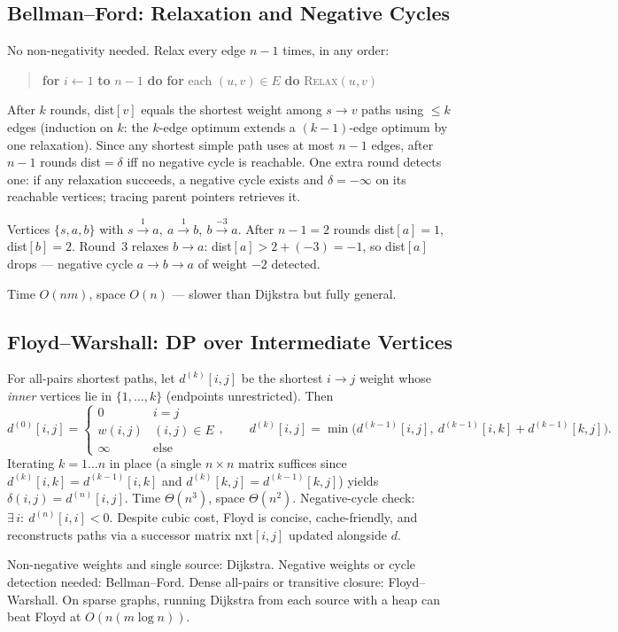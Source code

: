 \subsection{Bellman--Ford: Relaxation and Negative Cycles}
No non-negativity needed. Relax every edge $n-1$ times, in any order:

\begin{quote}\ttfamily\small
\textbf{for} $i\gets1$ \textbf{to} $n-1$ \textbf{do} \textbf{for} each $(u,v)\in E$ \textbf{do} \textsc{Relax}$(u,v)$
\end{quote}

After $k$ rounds, dist$[v]$ equals the shortest weight among $s\to v$ paths using $\le k$ edges (induction on $k$: the $k$-edge optimum extends a $(k-1)$-edge optimum by one relaxation). Since any shortest simple path uses at most $n-1$ edges, after $n-1$ rounds dist$=\delta$ iff no negative cycle is reachable. One extra round detects one: if any relaxation succeeds, a negative cycle exists and $\delta=-\infty$ on its reachable vertices; tracing parent pointers retrieves it.

\begin{example}
Vertices $\{s,a,b\}$ with $s\xrightarrow{1}a,\ a\xrightarrow{1}b,\ b\xrightarrow{-3}a$. After $n-1=2$ rounds dist$[a]=1$, dist$[b]=2$. Round~3 relaxes $b\to a$: dist$[a]>2+(-3)=-1$, so dist$[a]$ drops --- negative cycle $a\to b\to a$ of weight $-2$ detected.
\end{example}

Time $O(nm)$, space $O(n)$ --- slower than Dijkstra but fully general.

\subsection{Floyd--Warshall: DP over Intermediate Vertices}
For all-pairs shortest paths, let $d^{(k)}[i,j]$ be the shortest $i\to j$ weight whose \emph{inner} vertices lie in $\{1,\dots,k\}$ (endpoints unrestricted). Then
\[
d^{(0)}[i,j]=\begin{cases}0&i=j\\w(i,j)&(i,j)\in E\\\infty&\text{else}\end{cases},\qquad
d^{(k)}[i,j]=\min\bigl(d^{(k-1)}[i,j],\ d^{(k-1)}[i,k]+d^{(k-1)}[k,j]\bigr).
\]
Iterating $k=1\ldots n$ in place (a single $n\times n$ matrix suffices since $d^{(k)}[i,k]=d^{(k-1)}[i,k]$ and $d^{(k)}[k,j]=d^{(k-1)}[k,j]$) yields $\delta(i,j)=d^{(n)}[i,j]$. Time $\Theta(n^3)$, space $\Theta(n^2)$. Negative-cycle check: $\exists\,i:\ d^{(n)}[i,i]<0$. Despite cubic cost, Floyd is concise, cache-friendly, and reconstructs paths via a successor matrix $\text{nxt}[i,j]$ updated alongside $d$.
\begin{remark}
Non-negative weights and single source: Dijkstra. Negative weights or cycle detection needed: Bellman--Ford. Dense all-pairs or transitive closure: Floyd--Warshall. On sparse graphs, running Dijkstra from each source with a heap can beat Floyd at $O(n(m\log n))$.
\end{remark}

